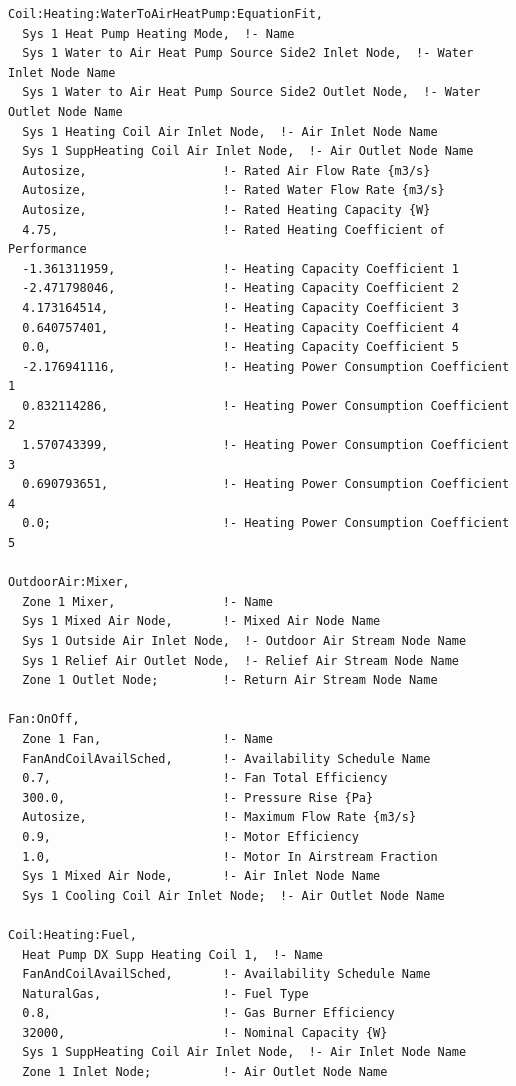 \begin{lstlisting}
Coil:Heating:WaterToAirHeatPump:EquationFit,
  Sys 1 Heat Pump Heating Mode,  !- Name
  Sys 1 Water to Air Heat Pump Source Side2 Inlet Node,  !- Water Inlet Node Name
  Sys 1 Water to Air Heat Pump Source Side2 Outlet Node,  !- Water Outlet Node Name
  Sys 1 Heating Coil Air Inlet Node,  !- Air Inlet Node Name
  Sys 1 SuppHeating Coil Air Inlet Node,  !- Air Outlet Node Name
  Autosize,                   !- Rated Air Flow Rate {m3/s}
  Autosize,                   !- Rated Water Flow Rate {m3/s}
  Autosize,                   !- Rated Heating Capacity {W}
  4.75,                       !- Rated Heating Coefficient of Performance
  -1.361311959,               !- Heating Capacity Coefficient 1
  -2.471798046,               !- Heating Capacity Coefficient 2
  4.173164514,                !- Heating Capacity Coefficient 3
  0.640757401,                !- Heating Capacity Coefficient 4
  0.0,                        !- Heating Capacity Coefficient 5
  -2.176941116,               !- Heating Power Consumption Coefficient 1
  0.832114286,                !- Heating Power Consumption Coefficient 2
  1.570743399,                !- Heating Power Consumption Coefficient 3
  0.690793651,                !- Heating Power Consumption Coefficient 4
  0.0;                        !- Heating Power Consumption Coefficient 5

OutdoorAir:Mixer,
  Zone 1 Mixer,               !- Name
  Sys 1 Mixed Air Node,       !- Mixed Air Node Name
  Sys 1 Outside Air Inlet Node,  !- Outdoor Air Stream Node Name
  Sys 1 Relief Air Outlet Node,  !- Relief Air Stream Node Name
  Zone 1 Outlet Node;         !- Return Air Stream Node Name

Fan:OnOff,
  Zone 1 Fan,                 !- Name
  FanAndCoilAvailSched,       !- Availability Schedule Name
  0.7,                        !- Fan Total Efficiency
  300.0,                      !- Pressure Rise {Pa}
  Autosize,                   !- Maximum Flow Rate {m3/s}
  0.9,                        !- Motor Efficiency
  1.0,                        !- Motor In Airstream Fraction
  Sys 1 Mixed Air Node,       !- Air Inlet Node Name
  Sys 1 Cooling Coil Air Inlet Node;  !- Air Outlet Node Name

Coil:Heating:Fuel,
  Heat Pump DX Supp Heating Coil 1,  !- Name
  FanAndCoilAvailSched,       !- Availability Schedule Name
  NaturalGas,                 !- Fuel Type
  0.8,                        !- Gas Burner Efficiency
  32000,                      !- Nominal Capacity {W}
  Sys 1 SuppHeating Coil Air Inlet Node,  !- Air Inlet Node Name
  Zone 1 Inlet Node;          !- Air Outlet Node Name


\end{lstlisting}
